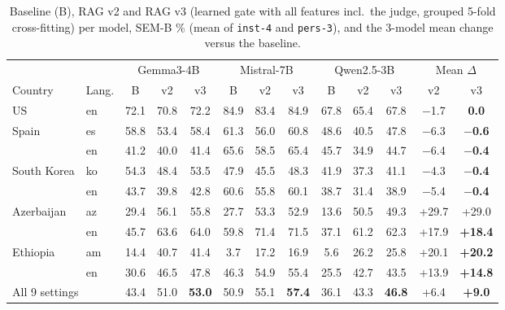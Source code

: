 \documentclass[11pt]{article}
\begin{document}
\begin{table}[h]
\centering
\caption{Baseline (B), RAG v2 and RAG v3 (learned gate with all features incl.\ the judge, grouped
5-fold cross-fitting) per model, SEM-B \% (mean of \texttt{inst-4} and \texttt{pers-3}), and the
3-model mean change versus the baseline.}
\label{tab:v3}
\small
\setlength{\tabcolsep}{4pt}
\begin{tabular}{ll|ccc|ccc|ccc|cc}
\toprule
 & & \multicolumn{3}{c|}{Gemma3-4B} & \multicolumn{3}{c|}{Mistral-7B} & \multicolumn{3}{c|}{Qwen2.5-3B} & \multicolumn{2}{c}{Mean $\Delta$} \\
Country & Lang. & B & v2 & v3 & B & v2 & v3 & B & v2 & v3 & v2 & v3 \\
\midrule
US          & en & 72.1 & 70.8 & 72.2 & 84.9 & 83.4 & 84.9 & 67.8 & 65.4 & 67.8 & $-$1.7 & \textbf{0.0} \\
Spain       & es & 58.8 & 53.4 & 58.4 & 61.3 & 56.0 & 60.8 & 48.6 & 40.5 & 47.8 & $-$6.3 & \textbf{$-$0.6} \\
            & en & 41.2 & 40.0 & 41.4 & 65.6 & 58.5 & 65.4 & 45.7 & 34.9 & 44.7 & $-$6.4 & \textbf{$-$0.4} \\
South Korea & ko & 54.3 & 48.4 & 53.5 & 47.9 & 45.5 & 48.3 & 41.9 & 37.3 & 41.1 & $-$4.3 & \textbf{$-$0.4} \\
            & en & 43.7 & 39.8 & 42.8 & 60.6 & 55.8 & 60.1 & 38.7 & 31.4 & 38.9 & $-$5.4 & \textbf{$-$0.4} \\
\midrule
Azerbaijan  & az & 29.4 & 56.1 & 55.8 & 27.7 & 53.3 & 52.9 & 13.6 & 50.5 & 49.3 & +29.7 & +29.0 \\
            & en & 45.7 & 63.6 & 64.0 & 59.8 & 71.4 & 71.5 & 37.1 & 61.2 & 62.3 & +17.9 & \textbf{+18.4} \\
Ethiopia    & am & 14.4 & 40.7 & 41.4 & 3.7  & 17.2 & 16.9 & 5.6  & 26.2 & 25.8 & +20.1 & \textbf{+20.2} \\
            & en & 30.6 & 46.5 & 47.8 & 46.3 & 54.9 & 55.4 & 25.5 & 42.7 & 43.5 & +13.9 & \textbf{+14.8} \\
\midrule
\multicolumn{2}{l|}{All 9 settings} & 43.4 & 51.0 & \textbf{53.0} & 50.9 & 55.1 & \textbf{57.4} & 36.1 & 43.3 & \textbf{46.8} & +6.4 & \textbf{+9.0} \\
\bottomrule
\end{tabular}
\end{table}
\end{document}
